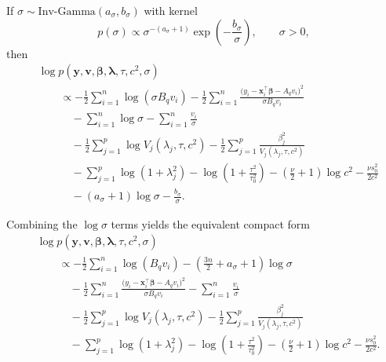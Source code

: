 \documentclass[11pt]{article}
\newcommand{\vect}[1]{\boldsymbol{#1}}
\newcommand{\IG}{\mathrm{Inv\text{-}Gamma}}
\begin{document}
If $\sigma \sim \IG(a_\sigma,b_\sigma)$ with kernel
\[
  p(\sigma) \propto \sigma^{-(a_\sigma+1)}
  \exp\!\left(-\frac{b_\sigma}{\sigma}\right), \qquad \sigma>0,
\]
then
\begin{align}
  &\log p(\vect{y},\vect{v},\vect{\beta},\vect{\lambda},\tau,c^2,\sigma)
  \nonumber\\
  &\qquad\propto
  -\frac{1}{2}\sum_{i=1}^n \log(\sigma B_q v_i)
  -\frac{1}{2}\sum_{i=1}^n
  \frac{
    \big(
      y_i-\vect{x}_i^\top\vect{\beta}-A_q v_i
    \big)^2
  }{
    \sigma B_q v_i
  }
  \nonumber\\
  &\qquad\quad
  -\sum_{i=1}^n \log \sigma
  -\sum_{i=1}^n \frac{v_i}{\sigma}
  \nonumber\\
  &\qquad\quad
  -\frac{1}{2}\sum_{j=1}^p \log V_j(\lambda_j,\tau,c^2)
  -\frac{1}{2}\sum_{j=1}^p \frac{\beta_j^2}{V_j(\lambda_j,\tau,c^2)}
  \nonumber\\
  &\qquad\quad
  -\sum_{j=1}^p \log(1+\lambda_j^2)
  -\log\!\left(1+\frac{\tau^2}{\tau_0^2}\right)
  -\left(\frac{\nu}{2}+1\right)\log c^2
  -\frac{\nu s_0^2}{2c^2}
  \nonumber\\
  &\qquad\quad
  -(a_\sigma+1)\log \sigma
  -\frac{b_\sigma}{\sigma}.
  \label{eq:log-kernel-full-joint-AL-IGsigma}
\end{align}

Combining the $\log \sigma$ terms yields the equivalent compact form
\begin{align}
  &\log p(\vect{y},\vect{v},\vect{\beta},\vect{\lambda},\tau,c^2,\sigma)
  \nonumber\\
  &\qquad\propto
  -\frac{1}{2}\sum_{i=1}^n \log(B_q v_i)
  -\left(\frac{3n}{2}+a_\sigma+1\right)\log \sigma
  \nonumber\\
  &\qquad\quad
  -\frac{1}{2}\sum_{i=1}^n
  \frac{
    \big(
      y_i-\vect{x}_i^\top\vect{\beta}-A_q v_i
    \big)^2
  }{
    \sigma B_q v_i
  }
  -\sum_{i=1}^n \frac{v_i}{\sigma}
  \nonumber\\
  &\qquad\quad
  -\frac{1}{2}\sum_{j=1}^p \log V_j(\lambda_j,\tau,c^2)
  -\frac{1}{2}\sum_{j=1}^p \frac{\beta_j^2}{V_j(\lambda_j,\tau,c^2)}
  \nonumber\\
  &\qquad\quad
  -\sum_{j=1}^p \log(1+\lambda_j^2)
  -\log\!\left(1+\frac{\tau^2}{\tau_0^2}\right)
  -\left(\frac{\nu}{2}+1\right)\log c^2
  -\frac{\nu s_0^2}{2c^2}.
  \label{eq:log-kernel-full-joint-AL-compact}
\end{align}
\end{document}
